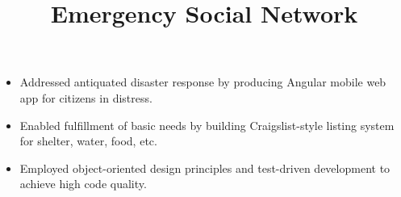 \documentclass[12pt]{res} %
\begin{document}
\begin{resume}
          \title{\textbf{Emergency Social Network}}
          \begin{position}
            \vspace{-14pt}
            \begin{itemize}[leftmargin=-0.4cm, rightmargin=0.8cm]
            \itemsep0em
            \item Addressed antiquated disaster response by producing Angular mobile web app for citizens in distress.
            \item Enabled fulfillment of basic needs by building Craigslist-style listing system for shelter, water, food, etc.
            \item Employed object-oriented design principles and test-driven development to achieve high code quality.
            \end{itemize}
          \end{position}
          \vspace{-10pt}

          

\end{resume}
\end{document}
